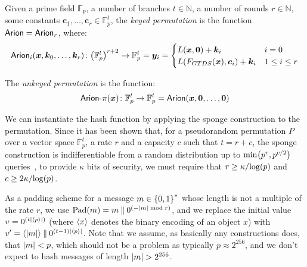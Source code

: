 \begin{definition}
  Given a prime field \(\mathbb{F}_p\), a number of branches \(t \in \mathbb{N}\), a number 
  of rounds \(r \in \mathbb{N}\), some constants \(\bm{c}_1, \dots, \bm{c}_r \in \mathbb{F}_p^t\), 
  the \emph{\Arion{} keyed permutation} is the function \(\Arion = \Arion_r\), where:
  \[
    \call{\Arion_i}{\bm{x}, \bm{k}_0, \dots, \bm{k}_r}\colon 
      \Parens*{\mathbb{F}_p^t}^{r+2} \to \mathbb{F}_p^t = \bm{y}_i =
      \begin{cases}
        \call{L}{\bm{x}, \bm{0}} + \bm{k}_i & i = 0 \\
        \call{L}{\call{F_{GTDS}}{\bm{x}}, \bm{c}_i} + \bm{k}_i & 1 \le i \le r
      \end{cases}
  \]
\end{definition}

\begin{definition}
  The \emph{\Arion{} unkeyed permutation} is the function:
  \[
    \call{\Arionp}{\bm{x}}\colon \mathbb{F}_p^t \to \mathbb{F}_p^t = 
      \call{\Arion}{\bm{x}, \bm{0}, \dots, \bm{0}}
  \]
\end{definition}

We can instantiate the hash function \Arionhash{} by applying the sponge construction to 
the \Arionp{} permutation.
Since it has been shown that, for a pseudorandom permutation \(P\) over a vector space 
\(\mathbb{F}_p^{t}\), a rate \(r\) and a capacity 
\(c\) such that \(t = r + c\), the sponge construction is indifferentiable from a random 
distribution up to \(\call{\min}{p^r, p^{c/2}}\) queries~\cite{BertoniDPV2008}, to provide 
\(\kappa \) bits of security, we must require that \(r \ge {\kappa}/{\call{\log}{p}}\) and 
\(c \ge {2\kappa}/{\call{\log}{p}}\).

As a padding scheme for a message \(m \in \Set{0, 1}^*\) whose length is not a multiple of the rate 
\(r\), we use \(\call{\Pad}{m} = m \concat 0^{\Parens*{-\abs{m} \bmod r}}\), and we replace the 
initial value \(v = 0^{\Parens*{t\abs{\Encode{p}}}}\) (where \(\Encode{x}\) denotes the binary 
encoding of an object \(x\)) with 
\(v' = \Encode{\abs{m}} \concat 0^{\Parens*{t-1}\abs{\Encode{p}}}\).
Note that we assume,  as basically any constructions does, that \(\abs{m} < p\), 
which should not be a problem as typically \(p \approx 2^{256}\), and we don't expect to hash 
messages of length \(\abs{m} > 2^{256}\).

